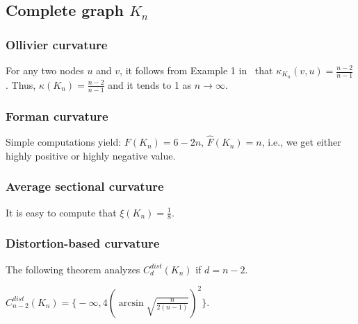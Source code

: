 \documentclass[runningheads]{llncs}
\begin{document}
\subsection{Complete graph $K_n$}

\subsubsection{Ollivier curvature}  
For any two nodes $u$ and $v$, it follows from Example 1 in~\cite{jost2014ollivier} that $\kappa_{K_n}(v, u) = \frac{n-2}{n-1}$. Thus, $\kappa(K_n) = \frac{n-2}{n-1}$ and it tends to 1 as $n \to \infty$.

\subsubsection{Forman curvature} 
Simple computations yield:
$F(K_n) = 6 - 2n$, $\hat{F}(K_n) = n$, i.e., we get either highly positive or highly negative value.

\subsubsection{Average sectional curvature} It is easy to compute that
$\xi(K_n) = \frac{1}{8}$.

\subsubsection{Distortion-based curvature}

The following theorem analyzes $C_d^{dist}(K_n)$ if $d = n-2$. 

\begin{theorem}\label{thm:clique_distortion}
$C_{n-2}^{dist}(K_n) = \bigg\{-\infty,  4 \left(\arcsin \sqrt{\frac{n}{2(n-1)}}\right)^2\bigg\}$.
\end{theorem}
\end{document}
